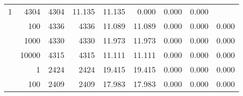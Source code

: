 \begin{table}
\begin{tabular}{rrrrrrrrr}
					\multirow{ 1 }{*}{ 1 } &
					
						
							    
							     4304  & 4304  
	                           & 11.135 & 11.135 & 0.000
	                           & 0.000 & 0.000  \\
	                
	            
					 &  
					 
					\multirow{ 1 }{*}{ 100 } &
					
						
							    
							     4336  & 4336  
	                           & 11.089 & 11.089 & 0.000
	                           & 0.000 & 0.000  \\
	                
	            
					 &  
					 
					\multirow{ 1 }{*}{ 1000 } &
					
						
							    
							     4330  & 4330  
	                           & 11.973 & 11.973 & 0.000
	                           & 0.000 & 0.000  \\
	                
	            
					 &  
					 
					\multirow{ 1 }{*}{ 10000 } &
					
						
							    
							     4315  & 4315  
	                           & 11.111 & 11.111 & 0.000
	                           & 0.000 & 0.000  \\
	                
	            
	        
				\noalign{\smallskip}\hline
				\multirow{ 4 }{*}{ 2000000 } &
				
					
					 
					\multirow{ 1 }{*}{ 1 } &
					
						
							    
							     2424  & 2424  
	                           & 19.415 & 19.415 & 0.000
	                           & 0.000 & 0.000  \\
	                
	            
					 &  
					 
					\multirow{ 1 }{*}{ 100 } &
					
						
							    
							     2409  & 2409  
	                           & 17.983 & 17.983 & 0.000
	                           & 0.000 & 0.000  \\
	                

\end{tabular}
\end{table}
